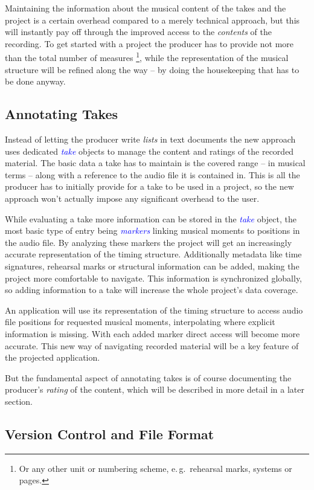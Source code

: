 \documentclass[11pt,a4paper]{article}
\newcommand*{\term}[1]{\textcolor{blue}{\emph{#1}}}
\begin{document}
Maintaining the information about the musical content of the takes and the project
is a certain overhead compared to a merely technical approach, but this will instantly
pay off through the improved access to the \emph{contents} of the recording.
To get started with a project the producer has to provide not more than
the total number of measures%
\footnote{Or any other unit or numbering scheme, e.\,g.\ rehearsal marks,
systems or pages.},
while the representation of the musical structure will be refined along the
way -- by doing the housekeeping that has to be done anyway.

\subsection{Annotating Takes}
Instead of letting the producer write \emph{lists} in text documents the new
approach uses dedicated \term{take} objects to manage the content and ratings
of the recorded material. The basic data a take has to maintain is the covered
range -- in musical terms -- along with a reference to the audio file it
is contained in. This is all the producer has to initially provide for a take
to be used in a project, so the new approach won't actually impose any
significant overhead to the user. 

While evaluating a take more information can be stored in the \term{take} object,
the most basic type of entry being \term{markers} linking musical moments to
positions in the audio file. By analyzing these markers the project will get
an increasingly accurate representation of the timing structure.
Additionally metadata like time signatures, rehearsal marks or
structural information can be added, making the project more comfortable to
navigate. This information is synchronized globally, so adding information to
a take will increase the whole project's data coverage.

An application will use its representation of the timing structure to access
audio file positions for requested musical moments, interpolating where
explicit information is missing. With each added marker direct access
will become more accurate. This new way of navigating recorded material will
be a key feature of the projected application.

But the fundamental aspect of annotating takes is of course documenting
the producer's \emph{rating} of the content, which will be described in
more detail in a later section.

\subsection{Version Control and File Format}
\end{document}
